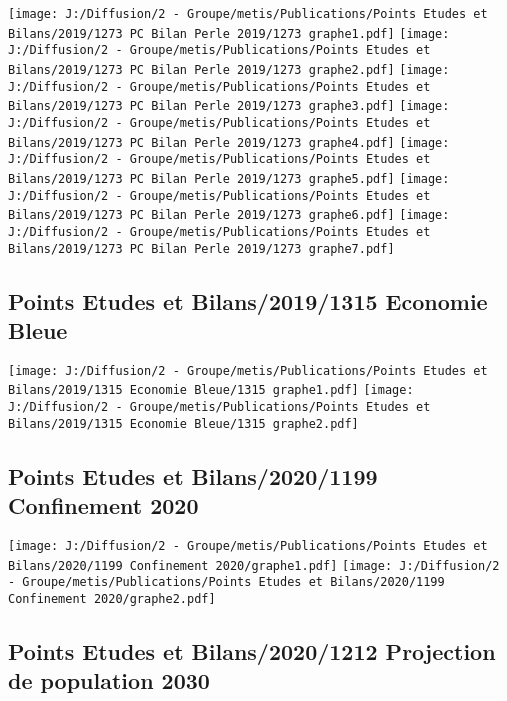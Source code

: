 \documentclass[
]{article}
\begin{document}
\texttt{[image: J:/Diffusion/2 - Groupe/metis/Publications/Points Etudes et Bilans/2019/1273 PC Bilan Perle 2019/1273 graphe1.pdf]}
\texttt{[image: J:/Diffusion/2 - Groupe/metis/Publications/Points Etudes et Bilans/2019/1273 PC Bilan Perle 2019/1273 graphe2.pdf]}
\texttt{[image: J:/Diffusion/2 - Groupe/metis/Publications/Points Etudes et Bilans/2019/1273 PC Bilan Perle 2019/1273 graphe3.pdf]}
\texttt{[image: J:/Diffusion/2 - Groupe/metis/Publications/Points Etudes et Bilans/2019/1273 PC Bilan Perle 2019/1273 graphe4.pdf]}
\texttt{[image: J:/Diffusion/2 - Groupe/metis/Publications/Points Etudes et Bilans/2019/1273 PC Bilan Perle 2019/1273 graphe5.pdf]}
\texttt{[image: J:/Diffusion/2 - Groupe/metis/Publications/Points Etudes et Bilans/2019/1273 PC Bilan Perle 2019/1273 graphe6.pdf]}
\texttt{[image: J:/Diffusion/2 - Groupe/metis/Publications/Points Etudes et Bilans/2019/1273 PC Bilan Perle 2019/1273 graphe7.pdf]}

\hypertarget{points-etudes-et-bilans20191315-economie-bleue}{%
\subsection{Points Etudes et Bilans/2019/1315 Economie
Bleue}\label{points-etudes-et-bilans20191315-economie-bleue}}

\texttt{[image: J:/Diffusion/2 - Groupe/metis/Publications/Points Etudes et Bilans/2019/1315 Economie Bleue/1315 graphe1.pdf]}
\texttt{[image: J:/Diffusion/2 - Groupe/metis/Publications/Points Etudes et Bilans/2019/1315 Economie Bleue/1315 graphe2.pdf]}

\hypertarget{points-etudes-et-bilans20201199-confinement-2020}{%
\subsection{Points Etudes et Bilans/2020/1199 Confinement
2020}\label{points-etudes-et-bilans20201199-confinement-2020}}

\texttt{[image: J:/Diffusion/2 - Groupe/metis/Publications/Points Etudes et Bilans/2020/1199 Confinement 2020/graphe1.pdf]}
\texttt{[image: J:/Diffusion/2 - Groupe/metis/Publications/Points Etudes et Bilans/2020/1199 Confinement 2020/graphe2.pdf]}

\hypertarget{points-etudes-et-bilans20201212-projection-de-population-2030}{%
\subsection{Points Etudes et Bilans/2020/1212 Projection de population
2030}\label{points-etudes-et-bilans20201212-projection-de-population-2030}}
\end{document}

